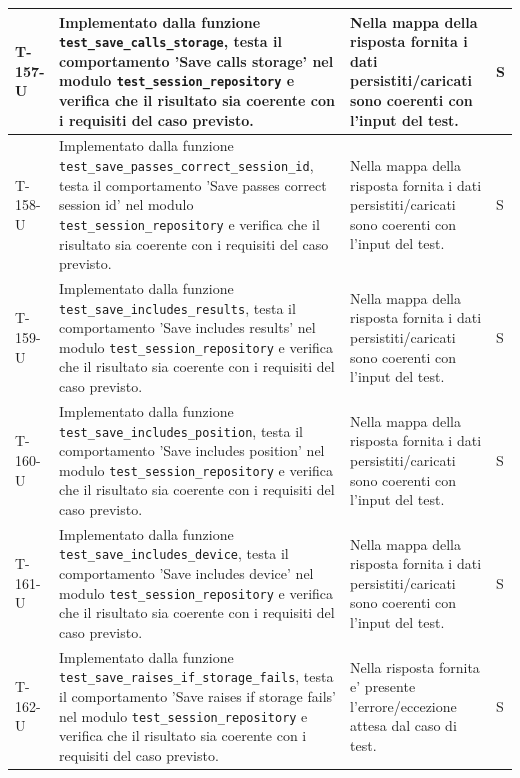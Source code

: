 \documentclass[a4paper,12pt]{article}
\begin{document}
{{\begin{longtable}{|>{\RaggedRight\arraybackslash}p{1.55cm}|>{\RaggedRight\arraybackslash}p{8.0cm}|>{\RaggedRight\arraybackslash}p{4.6cm}|>{\RaggedRight\arraybackslash}p{1.2cm}|}
        \hline
        T-157-U & Implementato dalla funzione \texttt{test\_\allowbreak save\_\allowbreak calls\_\allowbreak storage}, testa il comportamento 'Save calls storage' nel modulo \texttt{test\_\allowbreak session\_\allowbreak repository} e verifica che il risultato sia coerente con i requisiti del caso previsto. & Nella mappa della risposta fornita i dati persistiti/caricati sono coerenti con l'input del test. & S \\
        \hline
        T-158-U & Implementato dalla funzione \texttt{test\_\allowbreak save\_\allowbreak passes\_\allowbreak correct\_\allowbreak session\_\allowbreak id}, testa il comportamento 'Save passes correct session id' nel modulo \texttt{test\_\allowbreak session\_\allowbreak repository} e verifica che il risultato sia coerente con i requisiti del caso previsto. & Nella mappa della risposta fornita i dati persistiti/caricati sono coerenti con l'input del test. & S \\
        \hline
        T-159-U & Implementato dalla funzione \texttt{test\_\allowbreak save\_\allowbreak includes\_\allowbreak results}, testa il comportamento 'Save includes results' nel modulo \texttt{test\_\allowbreak session\_\allowbreak repository} e verifica che il risultato sia coerente con i requisiti del caso previsto. & Nella mappa della risposta fornita i dati persistiti/caricati sono coerenti con l'input del test. & S \\
        \hline
        T-160-U & Implementato dalla funzione \texttt{test\_\allowbreak save\_\allowbreak includes\_\allowbreak position}, testa il comportamento 'Save includes position' nel modulo \texttt{test\_\allowbreak session\_\allowbreak repository} e verifica che il risultato sia coerente con i requisiti del caso previsto. & Nella mappa della risposta fornita i dati persistiti/caricati sono coerenti con l'input del test. & S \\
        \hline
        T-161-U & Implementato dalla funzione \texttt{test\_\allowbreak save\_\allowbreak includes\_\allowbreak device}, testa il comportamento 'Save includes device' nel modulo \texttt{test\_\allowbreak session\_\allowbreak repository} e verifica che il risultato sia coerente con i requisiti del caso previsto. & Nella mappa della risposta fornita i dati persistiti/caricati sono coerenti con l'input del test. & S \\
        \hline
        T-162-U & Implementato dalla funzione \texttt{test\_\allowbreak save\_\allowbreak raises\_\allowbreak if\_\allowbreak storage\_\allowbreak fails}, testa il comportamento 'Save raises if storage fails' nel modulo \texttt{test\_\allowbreak session\_\allowbreak repository} e verifica che il risultato sia coerente con i requisiti del caso previsto. & Nella risposta fornita e' presente l'errore/eccezione attesa dal caso di test. & S \\

\end{longtable}}}
\end{document}
